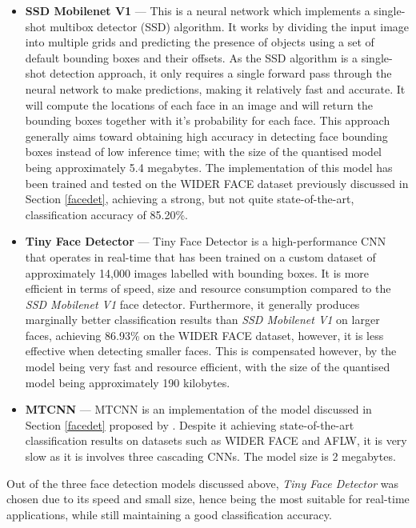 \documentclass[12pt, a4paper]{article}
\begin{document}
\begin{itemize}
    \item \textbf{SSD Mobilenet V1} --- This is a neural network which implements a single-shot multibox detector (SSD) algorithm. It works by dividing the input image into multiple grids and predicting the presence of objects using a set of default bounding boxes and their offsets. As the SSD algorithm is a single-shot detection approach, it only requires a single forward pass through the neural network to make predictions, making it relatively fast and accurate. It will compute the locations of each face in an image and will return the bounding boxes together with it's probability for each face. This approach generally aims toward obtaining high accuracy in detecting face bounding boxes instead of low inference time; with the size of the quantised model being approximately 5.4 megabytes. The implementation of this model has been trained and tested on the WIDER FACE dataset previously discussed in Section \ref{facedet}, achieving a strong, but not quite state-of-the-art, classification accuracy of 85.20\%.
    
    \item \textbf{Tiny Face Detector} --- Tiny Face Detector is a high-performance CNN that operates in real-time that has been trained on a custom dataset of approximately 14,000 images labelled with bounding boxes. It is more efficient in terms of speed, size and resource consumption compared to the \textit{SSD Mobilenet V1} face detector. Furthermore, it generally produces marginally better classification results than \textit{SSD Mobilenet V1} on larger faces, achieving 86.93\% on the WIDER FACE dataset, however, it is less effective when detecting smaller faces. This is compensated however, by the model being very fast and resource efficient, with the size of the quantised model being approximately 190 kilobytes.

    \item \textbf{MTCNN} --- MTCNN is an implementation of the model discussed in Section \ref{facedet} proposed by \cite{xiang2017joint}. Despite it achieving state-of-the-art classification results on datasets such as WIDER FACE and AFLW, it is very slow as it is involves three cascading CNNs. The model size is 2 megabytes.

\end{itemize}

Out of the three face detection models discussed above, \textit{Tiny Face Detector} was chosen due to its speed and small size, hence being the most suitable for real-time applications, while still maintaining a good classification accuracy.
\end{document}
